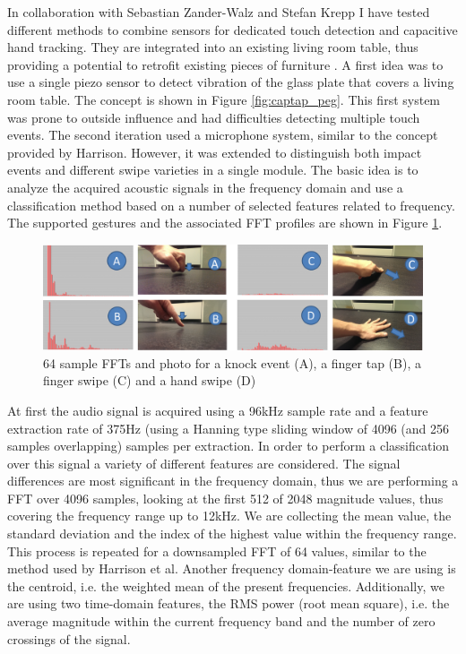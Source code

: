 In collaboration with Sebastian Zander-Walz and Stefan Krepp I have tested different methods to combine sensors for dedicated touch detection and capacitive hand tracking. They are integrated into an existing living room table, thus providing a potential to retrofit existing pieces of furniture \cite{Braun2013captap}. A first idea was to use a single piezo sensor to detect vibration of the glass plate that covers a living room table. The concept is shown in Figure \ref{fig:captap_peg}. This first system was prone to outside influence and had difficulties detecting multiple touch events. The second iteration used a microphone system, similar to the concept provided by Harrison. However, it was extended to distinguish both impact events and different swipe varieties in a single module. The basic idea is to analyze the acquired acoustic signals in the frequency domain and use a classification method based on a number of selected features related to frequency. The supported gestures and the associated FFT profiles are shown in Figure \ref{fig:alltouch}.

\begin{figure}[ht]
\centering
\includegraphics[width=1.0\textwidth]{images/alltouch}
\caption{64 sample FFTs and photo for a knock event (A), a finger tap (B), a finger swipe (C) and a hand swipe (D)}
\label{fig:alltouch}
\end{figure}

At first the audio signal is acquired using a 96kHz sample rate and a feature extraction rate of 375Hz (using a  Hanning type sliding window of 4096 (and 256 samples overlapping) samples per extraction. In order to perform a classification over this signal a variety of different features are considered. The signal differences are most significant in the frequency domain, thus we are performing a FFT over 4096 samples, looking at the first 512 of 2048 magnitude values, thus covering the frequency range up to 12kHz. We are collecting the mean value, the standard deviation and the index of the highest value within the frequency range. This process is repeated for a downsampled FFT of 64 values, similar to the method used by Harrison et al. Another frequency domain-feature we are using is the centroid, i.e. the weighted mean of the present frequencies. Additionally, we are using two time-domain features, the RMS power (root mean square), i.e. the average magnitude within the current frequency band and the number of zero crossings of the signal.


